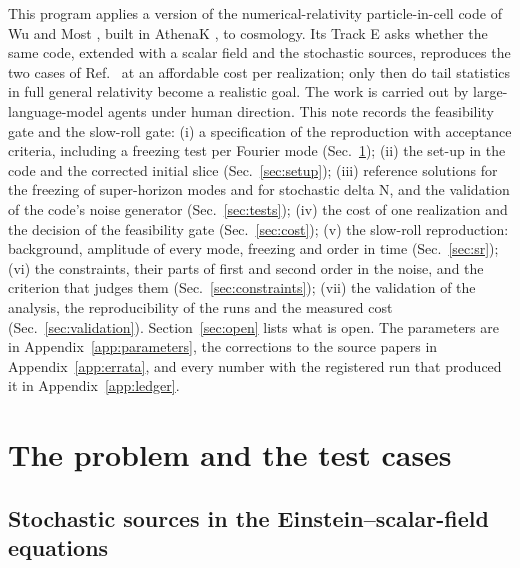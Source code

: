\documentclass[aps,prd,twocolumn,10pt,superscriptaddress,nofootinbib,longbibliography,floatfix]{revtex4-2}
\begin{document}
This program applies a version of the numerical-relativity particle-in-cell code of Wu and Most \cite{Wu:2026nrpic}, built in AthenaK \cite{Stone:2024athenak}, to cosmology. Its Track E asks whether the same code, extended with a scalar field and the stochastic sources, reproduces the two cases of Ref.~\cite{Launay:2025sinr} at an affordable cost per realization; only then do tail statistics in full general relativity become a realistic goal. The work is carried out by large-language-model agents under human direction. This note records the feasibility gate and the slow-roll gate: (i) a specification of the reproduction with acceptance criteria, including a freezing test per Fourier mode (Sec.~\ref{sec:problem}); (ii) the set-up in the code and the corrected initial slice (Sec.~\ref{sec:setup}); (iii) reference solutions for the freezing of super-horizon modes and for stochastic delta N, and the validation of the code's noise generator (Sec.~\ref{sec:tests}); (iv) the cost of one realization and the decision of the feasibility gate (Sec.~\ref{sec:cost}); (v) the slow-roll reproduction: background, amplitude of every mode, freezing and order in time (Sec.~\ref{sec:sr}); (vi) the constraints, their parts of first and second order in the noise, and the criterion that judges them (Sec.~\ref{sec:constraints}); (vii) the validation of the analysis, the reproducibility of the runs and the measured cost (Sec.~\ref{sec:validation}).
Section~\ref{sec:open} lists what is open. The parameters are in Appendix~\ref{app:parameters}, the corrections to the source papers in Appendix~\ref{app:errata}, and every number with the registered run that produced it in Appendix~\ref{app:ledger}.

\section{The problem and the test cases}\label{sec:problem}

\subsection{Stochastic sources in the Einstein--scalar-field equations}\label{sec:sources}
\end{document}
